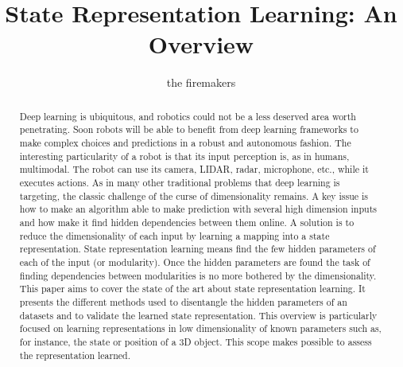 \documentclass[a4paper]{article}
\title{State Representation Learning: An Overview}
\author{the firemakers}
\begin{document}
\maketitle

\begin{abstract}
Deep learning is ubiquitous, and robotics could not be a less deserved area worth penetrating. Soon robots will be able to benefit from deep learning frameworks to make complex choices and predictions in a robust and autonomous fashion. The interesting particularity of a robot is that its input perception is, as in humans, multimodal. The robot can use its camera,  LIDAR, radar, microphone, etc., while it executes actions. As in many other traditional problems that deep learning is targeting, the classic challenge of the curse of dimensionality remains. A key issue is how to make an algorithm able to make prediction with several high dimension inputs and how make it find hidden dependencies between them online. A solution is to reduce the dimensionality of each input by learning a mapping into a state representation. State representation learning means find the few hidden parameters of each of the input (or modularity). Once the hidden parameters are found the task of finding dependencies between modularities is no more bothered by the dimensionality. This paper aims to cover the state of the art about state representation learning. It presents the different methods used to disentangle the hidden parameters of an datasets and to validate the learned state representation. This overview is particularly focused on learning representations in low dimensionality of known parameters such as, for instance, %
the state or position of a 3D object. This scope makes possible to assess the representation learned.
\end{abstract}
\end{document}

